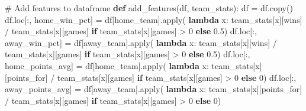 \documentclass[
  letterpaper,
  DIV=11,
  numbers=noendperiod]{scrartcl}
\newenvironment{Shaded}{\begin{snugshade}}{\end{snugshade}}
\newcommand{\BuiltInTok}[1]{\textcolor[rgb]{0.00,0.23,0.31}{#1}}
\newcommand{\CommentTok}[1]{\textcolor[rgb]{0.37,0.37,0.37}{#1}}
\newcommand{\ControlFlowTok}[1]{\textcolor[rgb]{0.00,0.23,0.31}{\textbf{#1}}}
\newcommand{\DecValTok}[1]{\textcolor[rgb]{0.68,0.00,0.00}{#1}}
\newcommand{\FloatTok}[1]{\textcolor[rgb]{0.68,0.00,0.00}{#1}}
\newcommand{\KeywordTok}[1]{\textcolor[rgb]{0.00,0.23,0.31}{\textbf{#1}}}
\newcommand{\NormalTok}[1]{\textcolor[rgb]{0.00,0.23,0.31}{#1}}
\newcommand{\OperatorTok}[1]{\textcolor[rgb]{0.37,0.37,0.37}{#1}}
\newcommand{\StringTok}[1]{\textcolor[rgb]{0.13,0.47,0.30}{#1}}
\begin{document}
\begin{Shaded}
\begin{Highlighting}[]
\CommentTok{\# Add features to dataframe}
\KeywordTok{def}\NormalTok{ add\_features(df, team\_stats):}
\NormalTok{    df }\OperatorTok{=}\NormalTok{ df.copy()}
\NormalTok{    df.loc[:, }\StringTok{\textquotesingle{}home\_win\_pct\textquotesingle{}}\NormalTok{] }\OperatorTok{=}\NormalTok{ df[}\StringTok{\textquotesingle{}home\_team\textquotesingle{}}\NormalTok{].}\BuiltInTok{apply}\NormalTok{(}
        \KeywordTok{lambda}\NormalTok{ x: team\_stats[x][}\StringTok{\textquotesingle{}wins\textquotesingle{}}\NormalTok{] }\OperatorTok{/}\NormalTok{ team\_stats[x][}\StringTok{\textquotesingle{}games\textquotesingle{}}\NormalTok{] }\ControlFlowTok{if}\NormalTok{ team\_stats[x][}\StringTok{\textquotesingle{}games\textquotesingle{}}\NormalTok{] }\OperatorTok{\textgreater{}} \DecValTok{0} \ControlFlowTok{else} \FloatTok{0.5}\NormalTok{)}
\NormalTok{    df.loc[:, }\StringTok{\textquotesingle{}away\_win\_pct\textquotesingle{}}\NormalTok{] }\OperatorTok{=}\NormalTok{ df[}\StringTok{\textquotesingle{}away\_team\textquotesingle{}}\NormalTok{].}\BuiltInTok{apply}\NormalTok{(}
        \KeywordTok{lambda}\NormalTok{ x: team\_stats[x][}\StringTok{\textquotesingle{}wins\textquotesingle{}}\NormalTok{] }\OperatorTok{/}\NormalTok{ team\_stats[x][}\StringTok{\textquotesingle{}games\textquotesingle{}}\NormalTok{] }\ControlFlowTok{if}\NormalTok{ team\_stats[x][}\StringTok{\textquotesingle{}games\textquotesingle{}}\NormalTok{] }\OperatorTok{\textgreater{}} \DecValTok{0} \ControlFlowTok{else} \FloatTok{0.5}\NormalTok{)}
\NormalTok{    df.loc[:, }\StringTok{\textquotesingle{}home\_points\_avg\textquotesingle{}}\NormalTok{] }\OperatorTok{=}\NormalTok{ df[}\StringTok{\textquotesingle{}home\_team\textquotesingle{}}\NormalTok{].}\BuiltInTok{apply}\NormalTok{(}
        \KeywordTok{lambda}\NormalTok{ x: team\_stats[x][}\StringTok{\textquotesingle{}points\_for\textquotesingle{}}\NormalTok{] }\OperatorTok{/}\NormalTok{ team\_stats[x][}\StringTok{\textquotesingle{}games\textquotesingle{}}\NormalTok{] }\ControlFlowTok{if}\NormalTok{ team\_stats[x][}\StringTok{\textquotesingle{}games\textquotesingle{}}\NormalTok{] }\OperatorTok{\textgreater{}} \DecValTok{0} \ControlFlowTok{else} \DecValTok{0}\NormalTok{)}
\NormalTok{    df.loc[:, }\StringTok{\textquotesingle{}away\_points\_avg\textquotesingle{}}\NormalTok{] }\OperatorTok{=}\NormalTok{ df[}\StringTok{\textquotesingle{}away\_team\textquotesingle{}}\NormalTok{].}\BuiltInTok{apply}\NormalTok{(}
        \KeywordTok{lambda}\NormalTok{ x: team\_stats[x][}\StringTok{\textquotesingle{}points\_for\textquotesingle{}}\NormalTok{] }\OperatorTok{/}\NormalTok{ team\_stats[x][}\StringTok{\textquotesingle{}games\textquotesingle{}}\NormalTok{] }\ControlFlowTok{if}\NormalTok{ team\_stats[x][}\StringTok{\textquotesingle{}games\textquotesingle{}}\NormalTok{] }\OperatorTok{\textgreater{}} \DecValTok{0} \ControlFlowTok{else} \DecValTok{0}\NormalTok{)}

\end{Highlighting}
\end{Shaded}
\end{document}
